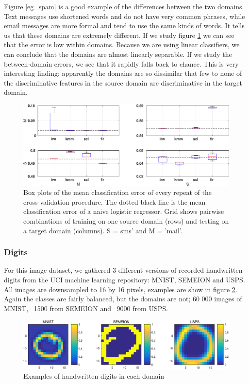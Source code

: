 \documentclass[twoside,11pt]{article}
\begin{document}
Figure \ref{eg_spam} is a good example of the differences between the two domains. Text messages use shortened words and do not have very common phrases, while email messages are more formal and tend to use the same kinds of words. It tells us that these domains are extremely different. If we study figure \ref{err_spam} we can see that the error is low within domains. Because we are using linear classifiers, we can conclude that the domains are almost linearly separable. If we study the between-domain errors, we see that it rapidly falls back to chance. This is very interesting finding; apparently the domains are so dissimilar that few to none of the discriminative features in the source domain are discriminative in the target domain. 

\begin{figure}[ht]
	\centering
	\includegraphics[width=.9\textwidth]{images/err_spam_box.eps}
	\caption{Box plots of the mean classification error of every repeat of the cross-validation procedure. The dotted black line is the mean classification error of a naive logistic regressor. Grid shows pairwise combinations of training on one source domain (rows) and testing on a target domain (columns). S = sms' and M = 'mail'.}
	\label{err_spam}
\end{figure}

\subsubsection{Digits}
For this image dataset, we gathered 3 different versions of recorded handwritten digits from the UCI machine learning repository: MNIST, SEMEION and USPS. All images are downsampled to 16 by 16 pixels, examples are show in figure \ref{eg_digits}. Again the classes are fairly balanced, but the domains are not; 60 000 images of MNIST, ~1500 from SEMEION and ~9000 from USPS. 

\begin{figure}[ht]
	\centering
	\includegraphics[width=.9\textwidth]{images/digits_examples.eps}
	\caption{Examples of handwritten digits in each domain}
	\label{eg_digits}
\end{figure}
\end{document}
